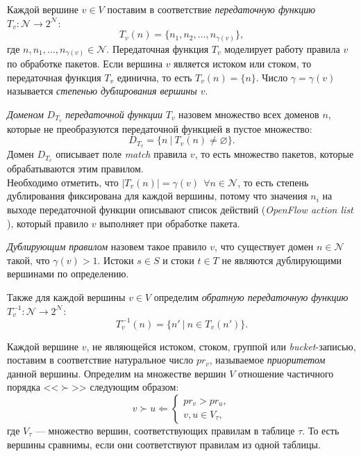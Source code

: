 \documentclass[../thesis.tex]{subfiles}
\begin{document}
Каждой вершине $v\in V$ поставим в соответствие \textit{передаточную функцию} $T_v:\mathcal{N} \rightarrow 2^{\mathcal{N}}$:
\begin{equation} \label{eq:transfer}
    T_v(n) = \big\{ n_1,n_2,\dots,n_{\gamma(v)} \big\},
\end{equation}
где $n,n_1,\dots,n_{\gamma(v)}\in \mathcal{N}$.
Передаточная функция $T_v$ моделирует работу правила $v$ по обработке пакетов.
Если вершина $v$ является истоком или стоком, то передаточная функция $T_v$ единична, то есть $T_v(n) = \{n\}$.
Число $\gamma=\gamma(v)$ называется \textit{степенью дублирования вершины $v$}.

\textit{Доменом} $D_{T_v}$ \textit{передаточной функции} $T_v$ назовем множество всех доменов $n$, которые не преобразуются передаточной функцией в пустое множество:
\begin{equation} \label{eq:transfer_domain}
    D_{T_v}
    =
    \big\{ n\ |\ T_v(n)\neq \varnothing \big\}.
\end{equation}
Домен $D_{T_v}$ описывает поле \textit{match} правила $v$, то есть множество пакетов, которые обрабатываются этим правилом.
\\

Необходимо отметить, что $\big|T_v(n)\big| = \gamma(v)\ \ \forall n\in \mathcal{N}$, то есть степень дублирования фиксирована для каждой вершины, потому что значения $n_i$ на выходе передаточной функции описывают список действий (\textit{OpenFlow action list} \cite{openflow15}), который правило $v$ выполняет при обработке пакета.

\textit{Дублирующим правилом} назовем такое правило $v$, что существует домен $n\in \mathcal{N}$ такой, что $\gamma(v) > 1$.
Истоки $s\in S$ и стоки $t\in T$ не являются дублирующими вершинами по определению.

Также для каждой вершины $v\in V$ определим \textit{обратную передаточную функцию} $T^{-1}_v:\mathcal{N} \rightarrow 2^{\mathcal{N}}$:
\begin{equation} \label{eq:inverse_transfer}
    T^{-1}_v(n)
    =
    \big\{ n'\ |\ n\in T_v(n') \big\}.
\end{equation}

Каждой вершине $v$, не являющейся истоком, стоком, группой или \textit{bucket}-\linebreak записью, поставим в соответствие натуральное число $pr_v$, называемое \textit{приоритетом} данной вершины.
Определим на множестве вершин $V$ отношение частичного порядка <<$\succ$>> следующим образом:
\begin{equation} \label{eq:partial_order}
    v \succ u
    \Leftarrow
    \begin{cases}
        pr_v > pr_u,\\
        v,u\in V_{\tau},
    \end{cases}
\end{equation}
где $V_{\tau}$ --- множество вершин, соответствующих правилам в таблице $\tau$.
То есть вершины сравнимы, если они соответствуют правилам из одной таблицы.
\end{document}
